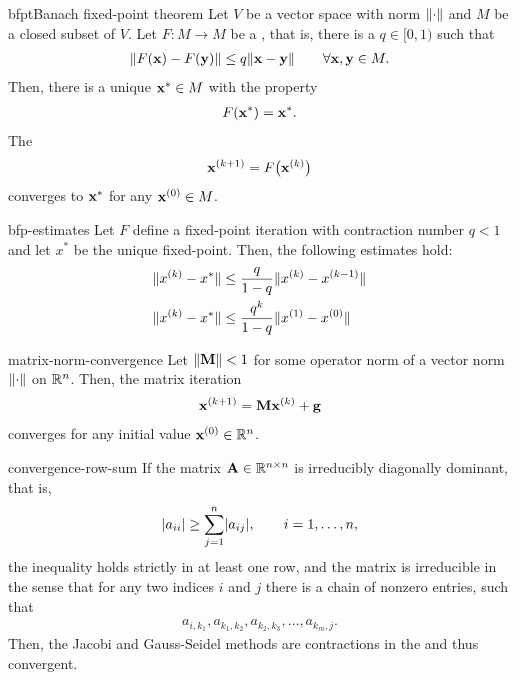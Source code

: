 \begin{Theorem*}{bfpt}{Banach fixed-point theorem}
  Let $V$ be a vector space with norm $\lVert\cdot\rVert$ and $M$ be a
  closed subset of $V$. Let $F\colon M\to M$ be a ,
  that is, there is a  $q\in[0,1)$ such that
  \begin{gather}
    \lVert F(\mathbf x)-F(\mathbf y)\rVert \le q \lVert\mathbf x-\mathbf y\rVert\qquad\forall \mathbf x,\mathbf y\in M.
  \end{gather}
  Then, there is a unique  $\mathbf x^*\in M$ with the property
  \begin{gather}
    F(\mathbf x^*) = \mathbf x^*.
  \end{gather}
  The 
  \begin{gather}
    \mathbf x^{(k+1)} = F\bigl(\mathbf x^{(k)}\bigr)
  \end{gather}
  converges to $\mathbf x^*$ for any $\mathbf x^{(0)}\in M$.
\end{Theorem*}

\begin{Corollary}{bfp-estimates}
  Let $F$ define a fixed-point iteration with contraction number $q<1$
  and let $x^*$ be the unique fixed-point. Then, the following
  estimates hold:
  \begin{align}
    \lVert x^{(k)} - x^*\rVert &\le \frac{q}{1-q} \lVert x^{(k)}-x^{(k-1)}\rVert\\
    \lVert x^{(k)} - x^*\rVert &\le \frac{q^k}{1-q} \lVert x^{(1)}-x^{(0)}\rVert
  \end{align}
\end{Corollary}  

\begin{Corollary}{matrix-norm-convergence}
  Let $\lVert\mathbf M\rVert < 1$ for some operator norm of a vector norm $\lVert\cdot\rVert$ on $\mathbb R^n$. Then, the matrix iteration
  \begin{gather}
    \mathbf x^{(k+1)} = \mathbf M \mathbf x^{(k)} + \mathbf g
  \end{gather}
  converges for any initial value $\mathbf x^{(0)}\in\mathbb R^n$.
\end{Corollary}

\begin{Example}{convergence-row-sum}
  If the matrix $\mathbf A\in\mathbb R^{n\times n}$ is irreducibly diagonally dominant, that is,
  \begin{gather}
    \lvert a_{ii}\rvert \ge \sum_{j=1}^n \lvert a_{ij}\rvert,\qquad i=1,\dots,n,
  \end{gather}
  the inequality holds strictly in at least one row, and the matrix is
  irreducible in the sense that for any two indices $i$ and $j$ there
  is a chain of nonzero entries, such that
  \begin{gather}
    a_{i,k_{1}}, a_{k_{1},k_{2}}, a_{k_{2},k_{3}},\dots, a_{k_{m},j}.
  \end{gather}
  Then, the Jacobi and Gauss-Seidel methods are contractions in the
   and thus convergent.
\end{Example}

